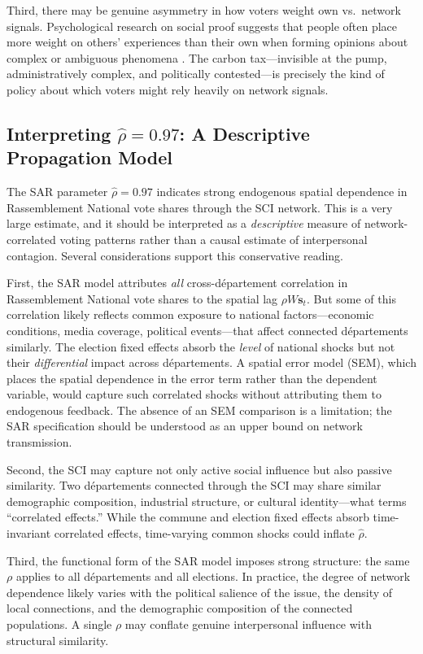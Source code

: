 \documentclass[12pt]{article}
\newcommand{\rn}{Rassemblement National}
\newcommand{\dept}{d\'{e}partement}
\newcommand{\depts}{d\'{e}partements}
\begin{document}
Third, there may be genuine asymmetry in how voters weight own vs.\ network signals. Psychological research on social proof suggests that people often place more weight on others' experiences than their own when forming opinions about complex or ambiguous phenomena \citep{stantcheva2022understanding}. The carbon tax---invisible at the pump, administratively complex, and politically contested---is precisely the kind of policy about which voters might rely heavily on network signals.

\subsection{Interpreting $\hat{\rho} = 0.97$: A Descriptive Propagation Model}

The SAR parameter $\hat{\rho} = 0.97$ indicates strong endogenous spatial dependence in \rn{} vote shares through the SCI network. This is a very large estimate, and it should be interpreted as a \textit{descriptive} measure of network-correlated voting patterns rather than a causal estimate of interpersonal contagion. Several considerations support this conservative reading.

First, the SAR model attributes \textit{all} cross-\dept{} correlation in \rn{} vote shares to the spatial lag $\rho W \mathbf{s}_t$. But some of this correlation likely reflects common exposure to national factors---economic conditions, media coverage, political events---that affect connected \depts{} similarly. The election fixed effects absorb the \textit{level} of national shocks but not their \textit{differential} impact across \depts{}. A spatial error model (SEM), which places the spatial dependence in the error term rather than the dependent variable, would capture such correlated shocks without attributing them to endogenous feedback. The absence of an SEM comparison is a limitation; the SAR specification should be understood as an upper bound on network transmission.

Second, the SCI may capture not only active social influence but also passive similarity. Two \depts{} connected through the SCI may share similar demographic composition, industrial structure, or cultural identity---what \citet{manski1993identification} terms ``correlated effects.'' While the commune and election fixed effects absorb time-invariant correlated effects, time-varying common shocks could inflate $\hat{\rho}$.

Third, the functional form of the SAR model imposes strong structure: the same $\rho$ applies to all \depts{} and all elections. In practice, the degree of network dependence likely varies with the political salience of the issue, the density of local connections, and the demographic composition of the connected populations. A single $\rho$ may conflate genuine interpersonal influence with structural similarity.
\end{document}
